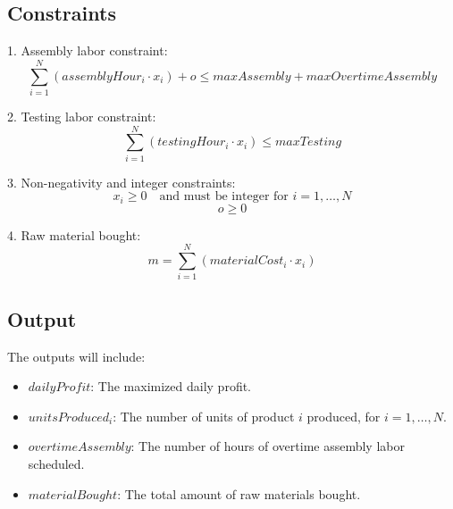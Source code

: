 \documentclass{article}
\begin{document}
\subsection*{Constraints}
1. Assembly labor constraint:
\[
\sum_{i=1}^{N} (assemblyHour_i \cdot x_i) + o \leq maxAssembly + maxOvertimeAssembly
\]

2. Testing labor constraint:
\[
\sum_{i=1}^{N} (testingHour_i \cdot x_i) \leq maxTesting
\]

3. Non-negativity and integer constraints:
\[
x_i \geq 0 \quad \text{and must be integer for } i = 1, \ldots, N
\]
\[
o \geq 0
\]

4. Raw material bought:
\[
m = \sum_{i=1}^{N} (materialCost_i \cdot x_i)
\]

\subsection*{Output}
The outputs will include:
\begin{itemize}
    \item $dailyProfit$: The maximized daily profit.
    \item $unitsProduced_i$: The number of units of product $i$ produced, for $i = 1, \ldots, N$.
    \item $overtimeAssembly$: The number of hours of overtime assembly labor scheduled.
    \item $materialBought$: The total amount of raw materials bought.
\end{itemize}
\end{document}
